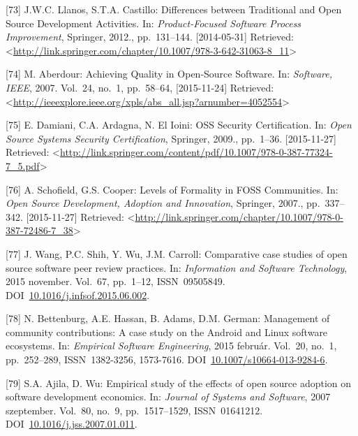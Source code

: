\documentclass[12pt,magyar,a4paper,oneside]{scrreprt}
\newenvironment{cslreferences}%
  {}%
  {\par}
\begin{document}
\begin{cslreferences}
\leavevmode\hypertarget{ref-llanos_differences_2012}{}%
{[}73{]} J.W.C. Llanos, S.T.A. Castillo: Differences between Traditional
and Open Source Development Activities. In: \emph{Product-Focused
Software Process Improvement}, Springer, 2012., pp.~131--144.
{[}2014-05-31{]} Retrieved:
\textless{}\url{http://link.springer.com/chapter/10.1007/978-3-642-31063-8_11}\textgreater{}

\leavevmode\hypertarget{ref-aberdour_achieving_2007}{}%
{[}74{]} M. Aberdour: Achieving Quality in Open-Source Software. In:
\emph{Software, IEEE}, 2007. Vol.~24, no.~1, pp.~58--64,
{[}2015-11-24{]} Retrieved:
\textless{}\url{http://ieeexplore.ieee.org/xpls/abs_all.jsp?arnumber=4052554}\textgreater{}

\leavevmode\hypertarget{ref-damiani_oss_2009}{}%
{[}75{]} E. Damiani, C.A. Ardagna, N. El Ioini: OSS Security
Certification. In: \emph{Open Source Systems Security Certification},
Springer, 2009., pp.~1--36. {[}2015-11-27{]} Retrieved:
\textless{}\url{http://link.springer.com/content/pdf/10.1007/978-0-387-77324-7_5.pdf}\textgreater{}

\leavevmode\hypertarget{ref-schofield_levels_2007}{}%
{[}76{]} A. Schofield, G.S. Cooper: Levels of Formality in FOSS
Communities. In: \emph{Open Source Development, Adoption and
Innovation}, Springer, 2007., pp.~337--342. {[}2015-11-27{]} Retrieved:
\textless{}\url{http://link.springer.com/chapter/10.1007/978-0-387-72486-7_38}\textgreater{}

\leavevmode\hypertarget{ref-wang_comparative_2015}{}%
{[}77{]} J. Wang, P.C. Shih, Y. Wu, J.M. Carroll: Comparative case
studies of open source software peer review practices. In:
\emph{Information and Software Technology}, 2015 november. Vol.~67,
pp.~1--12, ISSN~09505849.
DOI~\href{https://doi.org/10.1016/j.infsof.2015.06.002}{10.1016/j.infsof.2015.06.002}.

\leavevmode\hypertarget{ref-bettenburg_management_2015}{}%
{[}78{]} N. Bettenburg, A.E. Hassan, B. Adams, D.M. German: Management
of community contributions: A case study on the Android and Linux
software ecosystems. In: \emph{Empirical Software Engineering}, 2015
február. Vol.~20, no.~1, pp.~252--289, ISSN~1382-3256, 1573-7616.
DOI~\href{https://doi.org/10.1007/s10664-013-9284-6}{10.1007/s10664-013-9284-6}.

\leavevmode\hypertarget{ref-ajila_empirical_2007}{}%
{[}79{]} S.A. Ajila, D. Wu: Empirical study of the effects of open
source adoption on software development economics. In: \emph{Journal of
Systems and Software}, 2007 szeptember. Vol.~80, no.~9, pp.~1517--1529,
ISSN~01641212.
DOI~\href{https://doi.org/10.1016/j.jss.2007.01.011}{10.1016/j.jss.2007.01.011}.


\end{cslreferences}
\end{document}
